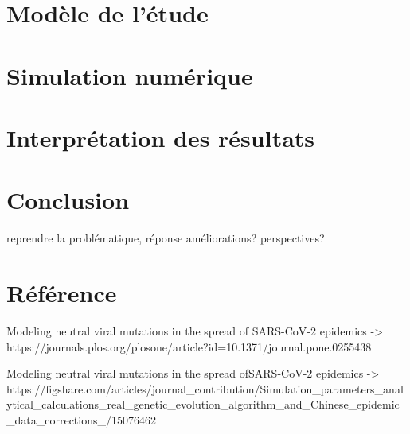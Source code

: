 \documentclass{article}
\begin{document}
\section{Modèle de l'étude}

\section{Simulation numérique}

\section{Interprétation des résultats}

\section{Conclusion}

reprendre la problématique, réponse
améliorations? perspectives?

\section{Référence}

Modeling neutral viral mutations in the spread of SARS-CoV-2 epidemics -> 
https://journals.plos.org/plosone/article?id=10.1371/journal.pone.0255438

Modeling neutral viral mutations in the spread ofSARS-CoV-2 epidemics ->
https://figshare.com/articles/journal_contribution/Simulation_parameters_analytical_calculations_real_genetic_evolution_algorithm_and_Chinese_epidemic_data_corrections_/15076462
\end{document}
